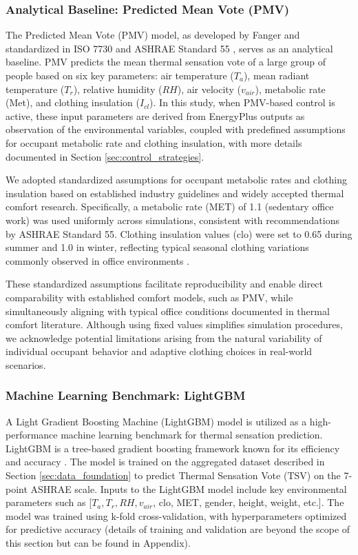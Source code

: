 \subsubsection{Analytical Baseline: Predicted Mean Vote (PMV)}
\label{sec:pmv_model}
The Predicted Mean Vote (PMV) model, as developed by Fanger and standardized in ISO 7730  and ASHRAE Standard 55 , serves as an analytical baseline. PMV predicts the mean thermal sensation vote of a large group of people based on six key parameters: air temperature ($T_a$), mean radiant temperature ($T_r$), relative humidity ($RH$), air velocity ($v_{air}$), metabolic rate (Met), and clothing insulation ($I_{cl}$). In this study, when PMV-based control is active, these input parameters are derived from EnergyPlus outputs as observation of the environmental variables, coupled with predefined assumptions for occupant metabolic rate and clothing insulation, with more details documented in Section \ref{sec:control_strategies}.

We adopted standardized assumptions for occupant metabolic rates and clothing insulation based on established industry guidelines and widely accepted thermal comfort research. Specifically, a metabolic rate (MET) of 1.1 (sedentary office work) was used uniformly across simulations, consistent with recommendations by ASHRAE Standard 55\cite{ASHRAE2020}. Clothing insulation values (clo) were set to 0.65 during summer and 1.0 in winter, reflecting typical seasonal clothing variations commonly observed in office environments \cite{ASHRAE2020}.

These standardized assumptions facilitate reproducibility and enable direct comparability with established comfort models, such as PMV, while simultaneously aligning with typical office conditions documented in thermal comfort literature. Although using fixed values simplifies simulation procedures, we acknowledge potential limitations arising from the natural variability of individual occupant behavior and adaptive clothing choices in real-world scenarios.

\subsubsection{Machine Learning Benchmark: LightGBM}\label{sec:lightgbm_model}
A Light Gradient Boosting Machine (LightGBM) model is utilized as a high-performance machine learning benchmark for thermal sensation prediction. LightGBM is a tree-based gradient boosting framework known for its efficiency and accuracy . The model is trained on the aggregated dataset described in Section \ref{sec:data_foundation} to predict Thermal Sensation Vote (TSV) on the 7-point ASHRAE scale. Inputs to the LightGBM model include key environmental parameters such as [$T_a, T_r, RH, v_{air}$, clo, MET, gender, height, weight, etc.]. The model was trained using k-fold cross-validation, with hyperparameters optimized for predictive accuracy (details of training and validation are beyond the scope of this section but can be found in Appendix).


